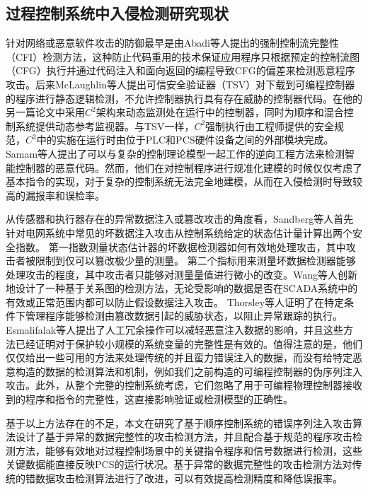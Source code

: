 \subsection{过程控制系统中入侵检测研究现状}

针对网络或恶意软件攻击的防御最早是由Abadi等人提出的强制控制流完整性（CFI）检测方法\parencite{Abadi09}，这种防止代码重用的技术保证应用程序只根据预定的控制流图（CFG）执行并通过代码注入和面向返回的编程导致CFG的偏差来检测恶意程序攻击。后来McLaughlin等人提出可信安全验证器（TSV）\parencite {TSV2014}对下载到可编程控制器的程序进行静态逻辑检测，不允许控制器执行具有存在威胁的控制器代码。在他的另一篇论文中采用$C^2$架构\parencite{McLaughlin13}来动态监测处在运行中的控制器，同时为顺序和混合控制系统提供动态参考监视器。与TSV一样，$C^2$强制执行由工程师提供的安全规范，$C^2$中的实施在运行时由位于PLC和PCS硬件设备之间的外部模块完成。 Samam等人提出了可以与复杂的控制理论模型一起工作的逆向工程方法来检测智能控制器的恶意代码\parencite{Zonouz2014}。然而，他们在对控制程序进行规准化建模的时候仅仅考虑了基本指令的实现，对于复杂的控制系统无法完全地建模，从而在入侵检测时导致较高的漏报率和误检率。

从传感器和执行器存在的异常数据注入或篡改攻击的角度看，Sandberg等人首先针对电网系统中常见的坏数据注入攻击从控制系统给定的状态估计量计算出两个安全指数。 第一指数测量状态估计器的坏数据检测器如何有效地处理攻击，其中攻击者被限制到仅可以篡改极少量的测量\parencite{Sandberg10}。 第二个指标用来测量坏数据检测器能够处理攻击的程度，其中攻击者只能够对测量量值进行微小的改变。Wang等人创新地设计了一种基于关系图的检测方法，无论受影响的数据是否在SCADA系统中的有效或正常范围内都可以防止假设数据注入攻击\parencite {wang2014}。 Thorsley等人证明了在特定条件下管理程序能够检测由篡改数据引起的威胁状态，以阻止异常跟踪的执行\parencite {Thorsley2014}。 Esmalifalak等人提出了人工冗余操作可以减轻恶意注入数据的影响，并且这些方法已经证明对于保护较小规模的系统变量的完整性是有效的\parencite{liu2014}。值得注意的是，他们仅仅给出一些可用的方法来处理传统的并且蛮力错误注入的数据，而没有给特定恶意构造的数据的检测算法和机制，例如我们之前构造的可编程控制器的伪序列注入攻击。此外，从整个完整的控制系统考虑，它们忽略了用于可编程物理控制器接收到的程序和指令的完整性，这直接影响验证或检测模型的正确性。

基于以上方法存在的不足，本文在研究了基于顺序控制系统的错误序列注入攻击算法设计了基于异常的数据完整性的攻击检测方法，并且配合基于规范的程序攻击检测方法，能够有效地对过程控制场景中的关键指令程序和信号数据进行检测，这些关键数据能直接反映PCS的运行状况。基于异常的数据完整性的攻击检测方法对传统的错数据攻击检测算法进行了改进，可以有效提高检测精度和降低误报率。

